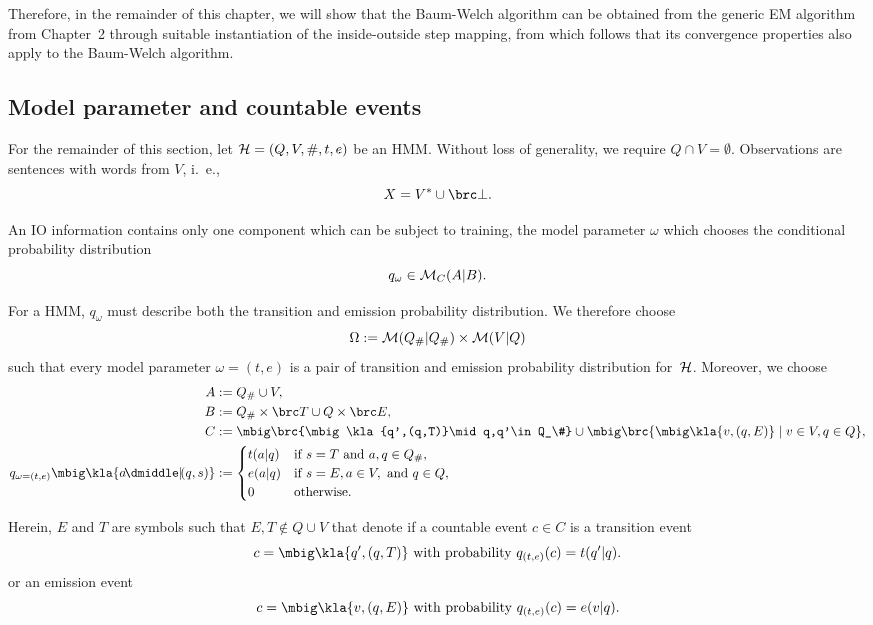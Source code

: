 Therefore, in the remainder of this chapter, we will show that the Baum-Welch
algorithm can be obtained from the generic EM algorithm from Chapter~2 through
suitable instantiation of the inside-outside step mapping, from which follows
that its convergence properties also apply to the Baum-Welch algorithm.

\subsection{Model parameter and countable events}

For the remainder of this section, let $\mathcal H = (Q,V,\#,t,e)$ be an HMM. Without
loss of generality, we require $Q\cap V=\emptyset$. Observations are sentences
with words from $V$, i.~e.,
\[
 X = V^* \cup\brc\bot. \label{eq:03-X}
\]

An IO information contains only one component which can be subject to training,
the model parameter $\omega$ which chooses the conditional probability
distribution
\[
 q_\omega \in \mathcal M_C(A|B).
\]

For a HMM, $q_\omega$ must describe both the transition and emission
probability distribution. We therefore choose
\label{eq:03-omega}
\[
 \Omega := \mathcal M(Q_\#|Q_\#) \times\mathcal M(V|Q)
\]
such that every model parameter $\omega=(t,e)$ is a pair of transition and
emission probability distribution for~$\mathcal H$. Moreover, we choose
\label{eq:03-ABC}\begin{align*}
 A &:= Q_\#\cup V, \\
 B &:= Q_\# \times \brc T \cup Q \times \brc E, \\
 C &:= \mbig\brc{\mbig\kla{q',(q,T)}\mid q,q'\in Q_\#} \cup \mbig\brc{\mbig\kla{v,(q,E)}\mid v\in V, q\in Q}, \\
 q_{\omega=(t,e)}\mbig\kla{a\npipe(q,s)} &:= \begin{cases}
  t(a|q) & \text{if } s = T \text{ and } a,q\in Q_\#, \\
  e(a|q) & \text{if } s = E, a\in V\!, \text{ and } q \in Q, \\
  0 & \text{otherwise}.
 \end{cases}
\end{align*}

Herein, $E$ and $T$ are symbols such that $E,T\notin Q\cup V$ that denote if a
countable event $c\in C$ is a transition event
\[
 c = \mbig\kla{q',(q,T)} \text{ with probability } q_{(t,e)}(c) = t(q'|q).
\]
or an emission event
\[
 c = \mbig\kla{v,(q,E)} \text{ with probability } q_{(t,e)}(c) = e(v|q).
\]

